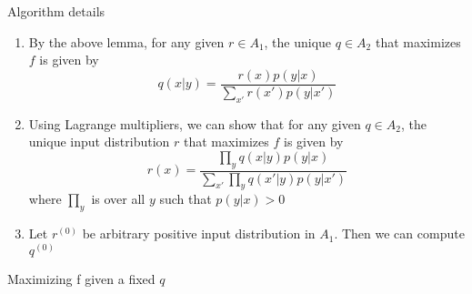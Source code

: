 \documentclass[../main.tex]{subfiles}
\begin{document}
\begin{bbox}{Algorithm details}
    \begin{enumerate}
        \item By the above lemma, for any given $r\in A_1$, the unique $q\in A_2$ that maximizes $f$ is given by \[
        q(x|y)=\frac{r(x)p(y|x)}{\sum_{x'}r(x')p(y|x')}
        \]
        \item Using Lagrange multipliers, we can show that for any given $q\in A_2$, the unique input distribution $r$ that maximizes $f$ is given by \[
        r(x) = \frac{\prod_y q(x|y)p(y|x)}{\sum_{x'}\prod_y q(x'|y)p(y|x')}
        \] where $\prod_y$ is over all $y$ such that $p(y|x)>0$
        \item Let $r^{(0)}$ be arbitrary positive input distribution in $A_1$. Then we can compute $q^{(0)}$
    \end{enumerate}
\end{bbox}
\begin{bbox}{Maximizing f given a fixed $q$}
    
\end{bbox}
\end{document}
